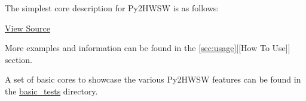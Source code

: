 %

The simplest core description for Py2HWSW is as follows:


\href{https://github.com/IObundle/py2hwsw/blob/main/py2hwsw/lib/hardware/basic_tests/iob_and/iob_and.py}{View Source}

More examples and information can be found in the \ref{sec:usage}[[How To Use]] section.

A set of basic cores to showcase the various Py2HWSW features can be found in the \href{https://github.com/IObundle/py2hwsw/tree/main/py2hwsw/lib/hardware/basic_tests}{basic\_tests} directory.
